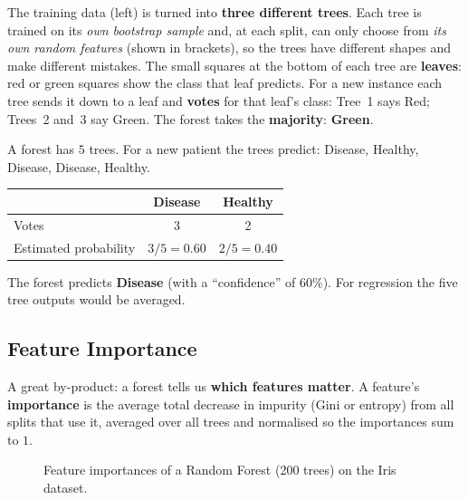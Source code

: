 \begin{explain}
The training data (left) is turned into \textbf{three different trees}. Each tree is trained on its \emph{own bootstrap sample} and, at each split, can only choose from \emph{its own random features} (shown in brackets), so the trees have different shapes and make different mistakes. The small squares at the bottom of each tree are \textbf{leaves}: red or green squares show the class that leaf predicts. For a new instance each tree sends it down to a leaf and \textbf{votes} for that leaf's class: Tree~1 says Red; Trees~2 and~3 say Green. The forest takes the \textbf{majority}: \textbf{Green}.
\end{explain}

\begin{example}
A forest has $5$ trees. For a new patient the trees predict: Disease, Healthy, Disease, Disease, Healthy.

\medskip
\begin{center}
\begin{tabular}{@{}lcc@{}}
\toprule
 & \textbf{Disease} & \textbf{Healthy}\\
\midrule
Votes & 3 & 2\\
Estimated probability & $3/5=0.60$ & $2/5=0.40$\\
\bottomrule
\end{tabular}
\end{center}
\medskip
The forest predicts \textbf{Disease} (with a ``confidence'' of $60\%$). For regression the five tree outputs would be averaged.
\end{example}

\subsection{Feature Importance}

A great by-product: a forest tells us \textbf{which features matter}. A feature's \textbf{importance} is the average total decrease in impurity (Gini or entropy) from all splits that use it, averaged over all trees and normalised so the importances sum to $1$.

\begin{figure}[!htbp]
\centering
{}
\caption{Feature importances of a Random Forest (200 trees) on the Iris dataset.}\label{fig:imp}
\end{figure}

